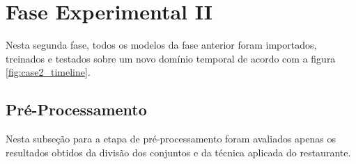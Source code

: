 \documentclass[	12pt, Times, openright, twoside, a4paper, english, brazil]{abntex2}
\begin{document}
    \section{Fase Experimental II}
        
        \begin{figure}[H]
        \end{figure}
	    Nesta segunda fase, todos os modelos da fase anterior foram importados, treinados e testados sobre um novo domínio temporal de acordo com a figura \ref{fig:case2_timeline}.
        
	    \subsection{Pré-Processamento}
	        Nesta subseção para a etapa de pré-processamento foram avaliados apenas os resultados obtidos da divisão dos conjuntos e da técnica aplicada do restaurante.
	        
\end{document}
